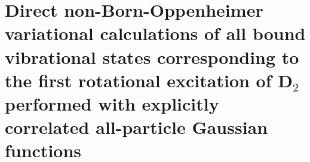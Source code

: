 \chapter{Direct non-Born-Oppenheimer variational calculations of all bound vibrational states corresponding to the first rotational excitation of D$_2$ performed with explicitly correlated all-particle Gaussian functions\label{apndx12}}



